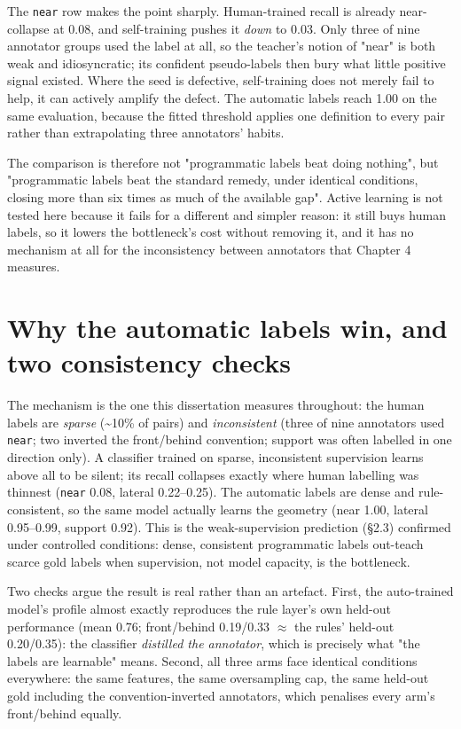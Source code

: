 The \texttt{near} row makes the point sharply. Human-trained recall is already near-collapse at 0.08, and self-training pushes it \textit{down} to 0.03. Only three of nine annotator groups used the label at all, so the teacher's notion of "near" is both weak and idiosyncratic; its confident pseudo-labels then bury what little positive signal existed. Where the seed is defective, self-training does not merely fail to help, it can actively amplify the defect. The automatic labels reach 1.00 on the same evaluation, because the fitted threshold applies one definition to every pair rather than extrapolating three annotators' habits.

The comparison is therefore not "programmatic labels beat doing nothing", but "programmatic labels beat the standard remedy, under identical conditions, closing more than six times as much of the available gap". Active learning is not tested here because it fails for a different and simpler reason: it still buys human labels, so it lowers the bottleneck's cost without removing it, and it has no mechanism at all for the inconsistency between annotators that Chapter 4 measures.

\section{Why the automatic labels win, and two consistency checks}

The mechanism is the one this dissertation measures throughout: the human labels are \textit{sparse} (\textasciitilde{}10\% of pairs) and \textit{inconsistent} (three of nine annotators used \texttt{near}; two inverted the front/behind convention; support was often labelled in one direction only). A classifier trained on sparse, inconsistent supervision learns above all to be silent; its recall collapses exactly where human labelling was thinnest (\texttt{near} 0.08, lateral 0.22--0.25). The automatic labels are dense and rule-consistent, so the same model actually learns the geometry (near 1.00, lateral 0.95--0.99, support 0.92). This is the weak-supervision prediction (\S2.3) confirmed under controlled conditions: dense, consistent programmatic labels out-teach scarce gold labels when supervision, not model capacity, is the bottleneck.

Two checks argue the result is real rather than an artefact. First, the auto-trained model's profile almost exactly reproduces the rule layer's own held-out performance (mean 0.76; front/behind 0.19/0.33 $\approx$ the rules' held-out 0.20/0.35): the classifier \textit{distilled the annotator}, which is precisely what "the labels are learnable" means. Second, all three arms face identical conditions everywhere: the same features, the same oversampling cap, the same held-out gold including the convention-inverted annotators, which penalises every arm's front/behind equally.

